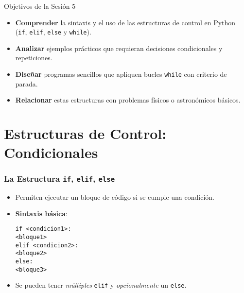\documentclass[10pt]{beamer}
\begin{document}
\begin{frame}{Objetivos de la Sesión 5}
  \begin{itemize}
    \item \textbf{Comprender} la sintaxis y el uso de las estructuras de control en Python (\texttt{if}, \texttt{elif}, \texttt{else} y \texttt{while}).
    \item \textbf{Analizar} ejemplos prácticos que requieran decisiones condicionales y repeticiones.
    \item \textbf{Diseñar} programas sencillos que apliquen bucles \texttt{while} con criterio de parada.
    \item \textbf{Relacionar} estas estructuras con problemas físicos o astronómicos básicos.
  \end{itemize}
\end{frame}

\section{Estructuras de Control: Condicionales}

\begin{frame}[fragile]
	\frametitle{La Estructura \texttt{if}, \texttt{elif}, \texttt{else}}
  \begin{itemize}
    \item Permiten ejecutar un bloque de código si se cumple una condición.
    \item \textbf{Sintaxis básica}:

\texttt{if <condicion1>:} \\
\quad \texttt{<bloque1>} \\
\texttt{elif <condicion2>:} \\
\quad \texttt{<bloque2>} \\
\texttt{else:} \\
\quad \texttt{<bloque3>}

    \item Se pueden tener \emph{múltiples} \texttt{elif} y \emph{opcionalmente} un \texttt{else}.
  \end{itemize}
\end{frame}
\end{document}
